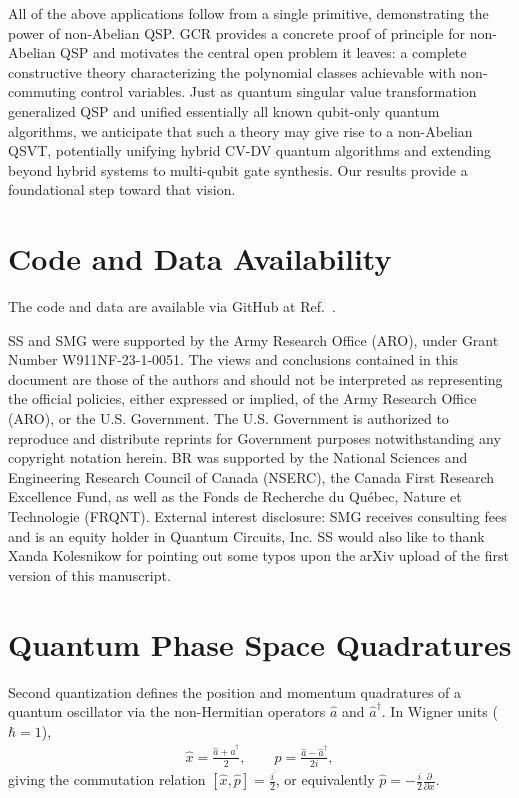 \documentclass[aps,prx,showpacs,notitlepage,twocolumn,superscriptaddress,nofootinbib,preprintnumbers,floatfix,10pt, longbibliography]{revtex4-2}
\begin{document}
All of the above applications follow from a single primitive, demonstrating the power of non-Abelian QSP. GCR provides a concrete proof of principle for non-Abelian QSP and motivates the central open problem it leaves: a complete constructive theory characterizing the polynomial classes achievable with non-commuting control variables. Just as quantum singular value transformation generalized QSP and unified essentially all known qubit-only quantum algorithms, we anticipate that such a theory may give rise to a non-Abelian QSVT, potentially unifying hybrid CV-DV quantum algorithms and extending beyond hybrid systems to multi-qubit gate synthesis. Our results provide a foundational step toward that vision.

\section{Code and Data Availability}
The code and data are available via GitHub at Ref.~\cite{singh_shraggynaqsp_simulations_2025}.

\begin{acknowledgments}
SS and SMG were supported by the Army Research Office (ARO), under 
Grant Number W911NF-23-1-0051. The views and conclusions contained in this document are 
those of the authors and should not be interpreted as representing the official policies, 
either expressed or implied, of the Army Research Office (ARO), or the U.S. Government. 
The U.S. Government is authorized to reproduce and distribute reprints for Government purposes 
notwithstanding any copyright notation herein. BR was supported by the National Sciences and Engineering Research Council of Canada (NSERC), the Canada First Research Excellence Fund, as well as the Fonds de Recherche du Québec, Nature et Technologie (FRQNT). External interest disclosure: SMG receives consulting fees and is an equity holder in Quantum Circuits, Inc. SS would also like to thank Xanda Kolesnikow for pointing out some typos upon the arXiv upload of the first version of this manuscript.
\end{acknowledgments}
\appendix
\section{Quantum Phase Space Quadratures}\label{app:phase-space}

Second quantization defines the position and momentum quadratures of a
quantum oscillator via the non-Hermitian operators $\hat{a}$ and
$\hat{a}^\dagger$.  In Wigner units ($\hbar=1$),
\begin{align}
  \hat{x} = \frac{\hat{a}+\hat{a}^\dagger}{2}, \qquad
  \hat{p} = \frac{\hat{a}-\hat{a}^\dagger}{2i},
\end{align}
giving the commutation relation $[\hat{x},\hat{p}]=\frac{i}{2}$, or
equivalently $\hat{p}=-\frac{i}{2}\frac{\partial}{\partial x}$.
\end{document}
